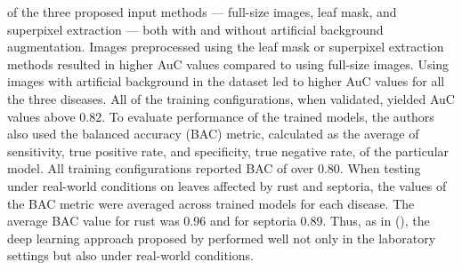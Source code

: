\documentclass{BachelorBUI}
\begin{document}
of the three proposed input methods --- full-size images, leaf mask, and superpixel extraction --- both with and without artificial background augmentation. Images preprocessed using the leaf mask or superpixel extraction methods resulted in higher AuC values compared to using full-size images. Using images with artificial background in the dataset led to higher AuC values for all the three diseases. All of the training configurations, when validated, yielded AuC values above 0.82. To evaluate performance of the trained models, the authors also used the balanced accuracy (BAC) metric, calculated as the average of sensitivity, true positive rate, and specificity, true negative rate, of the particular model. All training configurations reported BAC of over 0.80. When testing under real-world conditions on leaves affected by rust and septoria, the values of the BAC metric were averaged across trained models for each disease. The average BAC value for rust was 0.96 and for septoria 0.89. Thus, as in (\cite{Johannes:2017}), the deep learning approach proposed by \textcite{Picon:2019} performed well not only in the laboratory settings but also under real-world conditions.
\end{document}
